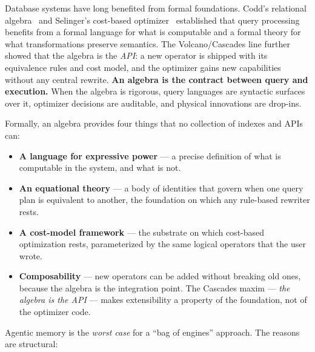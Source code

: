 \documentclass[sigconf,nonacm,review]{acmart}
\theoremstyle{plain}
\theoremstyle{definition}
\theoremstyle{remark}
\begin{document}
Database systems have long benefited from formal foundations. Codd's
relational algebra~\cite{codd1970} and Selinger's cost-based
optimizer~\cite{selinger1979} established that query processing
benefits from a formal language for what is computable and a formal
theory for what transformations preserve semantics. The
Volcano/Cascades line further showed that the algebra is the
\emph{API}: a new operator is shipped with its equivalence rules and
cost model, and the optimizer gains new capabilities without any
central rewrite. \textbf{An algebra is the contract between query
and execution.} When the algebra is rigorous, query languages are
syntactic surfaces over it, optimizer decisions are auditable, and
physical innovations are drop-ins.

Formally, an algebra provides four things that no collection of
indexes and APIs can:

\begin{itemize}[leftmargin=*]
  \item \textbf{A language for expressive power} --- a precise
    definition of what is computable in the system, and what is not.
  \item \textbf{An equational theory} --- a body of identities that
    govern when one query plan is equivalent to another, the
    foundation on which any rule-based rewriter rests.
  \item \textbf{A cost-model framework} --- the substrate on which
    cost-based optimization rests, parameterized by the same logical
    operators that the user wrote.
  \item \textbf{Composability} --- new operators can be added without
    breaking old ones, because the algebra is the integration point.
    The Cascades maxim --- \emph{the algebra is the API} --- makes
    extensibility a property of the foundation, not of the optimizer
    code.
\end{itemize}

Agentic memory is the \emph{worst case} for a ``bag of engines''
approach. The reasons are structural:
\end{document}
